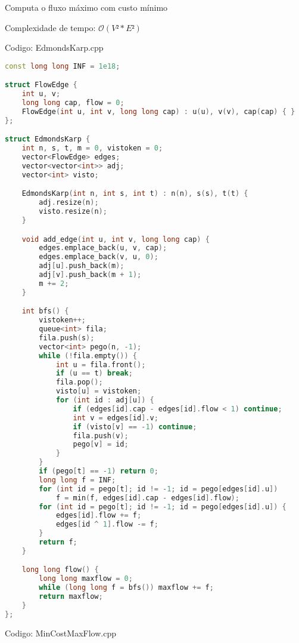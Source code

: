 \documentclass[10pt, a4paper, oneside]{book}
\begin{document}
\textbf{} 


Computa o fluxo máximo com custo mínimo



Complexidade de tempo: $\mathcal{O}(V² * E²)$

\hfill

Codigo: EdmondsKarp.cpp

\begin{lstlisting}[language=C++]
const long long INF = 1e18;

struct FlowEdge {
    int u, v;
    long long cap, flow = 0;
    FlowEdge(int u, int v, long long cap) : u(u), v(v), cap(cap) { }
};

struct EdmondsKarp {
    int n, s, t, m = 0, vistoken = 0;
    vector<FlowEdge> edges;
    vector<vector<int>> adj;
    vector<int> visto;

    EdmondsKarp(int n, int s, int t) : n(n), s(s), t(t) {
        adj.resize(n);
        visto.resize(n);
    }

    void add_edge(int u, int v, long long cap) {
        edges.emplace_back(u, v, cap);
        edges.emplace_back(v, u, 0);
        adj[u].push_back(m);
        adj[v].push_back(m + 1);
        m += 2;
    }

    int bfs() {
        vistoken++;
        queue<int> fila;
        fila.push(s);
        vector<int> pego(n, -1);
        while (!fila.empty()) {
            int u = fila.front();
            if (u == t) break;
            fila.pop();
            visto[u] = vistoken;
            for (int id : adj[u]) {
                if (edges[id].cap - edges[id].flow < 1) continue;
                int v = edges[id].v;
                if (visto[v] == -1) continue;
                fila.push(v);
                pego[v] = id;
            }
        }
        if (pego[t] == -1) return 0;
        long long f = INF;
        for (int id = pego[t]; id != -1; id = pego[edges[id].u])
            f = min(f, edges[id].cap - edges[id].flow);
        for (int id = pego[t]; id != -1; id = pego[edges[id].u]) {
            edges[id].flow += f;
            edges[id ^ 1].flow -= f;
        }
        return f;
    }

    long long flow() {
        long long maxflow = 0;
        while (long long f = bfs()) maxflow += f;
        return maxflow;
    }
};
\end{lstlisting}
\hfill

Codigo: MinCostMaxFlow.cpp
\end{document}
